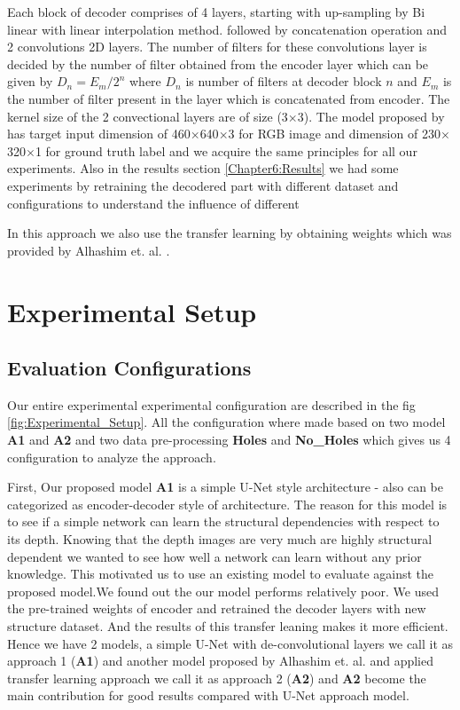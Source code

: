 Each block of decoder comprises of 4 layers, starting with up-sampling by Bi linear with linear interpolation method. followed by concatenation operation and 2 convolutions 2D layers. The number of filters for these convolutions layer is decided by the number of filter obtained from the encoder layer which can be given by \(D_n =  {E_m} / {2^n}\) where \(D_n\) is number of filters at decoder block \(n\) and \(E_m\) is the number of filter present in the layer which is concatenated from encoder. The kernel size of the 2 convectional layers are of size (3$\times$3). The model proposed by  \cite{Alhashim2018} has target input dimension of 460$\times$640$\times$3 for RGB image and  dimension of 230$\times$320$\times$1 for ground truth label and we acquire the same principles for all our experiments. Also in the results section \ref{Chapter6:Results} we had some experiments by retraining the decodered part with different dataset and configurations to understand the influence of different 

In this approach we also use the transfer learning by obtaining weights which was provided by Alhashim et. al. \cite{Alhashim2018}. 


\section{Experimental Setup}
\label{Chapter5:Experimental_Setup}
\subsection{Evaluation Configurations}

Our entire experimental experimental configuration are described in the fig \ref{fig:Experimental_Setup}. All the configuration where made based on two model \textbf{A1} and \textbf{A2} and two data pre-processing \textbf{Holes} and \textbf{No\_Holes} which gives us 4 configuration to analyze the approach. 


First, Our proposed model \textbf{A1} is a simple U-Net style architecture - also can be categorized as encoder-decoder style of architecture. The reason for this model is to see if a simple network can learn the structural dependencies with respect to its depth. Knowing that the depth images are very much are highly structural dependent we wanted to see how well a network can learn without any prior knowledge. This motivated us to use an existing model to evaluate against the proposed model.We found out the our model performs relatively poor. We used the pre-trained weights of encoder and retrained the decoder layers with new structure dataset. And the results of this transfer leaning makes it more efficient. Hence we have 2 models, a simple U-Net with de-convolutional layers we call it as approach 1  (\textbf{A1}) and another model proposed by Alhashim et. al. \cite{Alhashim2018} and applied transfer learning approach we call it as approach 2 (\textbf{A2}) and \textbf{A2} become the main contribution for good results compared with U-Net approach model. 

